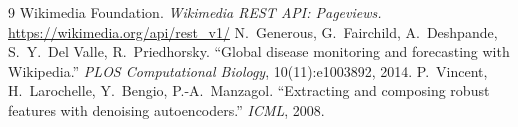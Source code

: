 \documentclass[11pt]{article}
\begin{document}
\begin{thebibliography}{9}
Wikimedia Foundation. \emph{Wikimedia REST API: Pageviews.}\\
\url{https://wikimedia.org/api/rest_v1/}
N.~Generous, G.~Fairchild, A.~Deshpande, S.~Y.~Del Valle, R.~Priedhorsky.
``Global disease monitoring and forecasting with Wikipedia.''
\emph{PLOS Computational Biology}, 10(11):e1003892, 2014.
P.~Vincent, H.~Larochelle, Y.~Bengio, P.-A.~Manzagol.
``Extracting and composing robust features with denoising autoencoders.''
\emph{ICML}, 2008.
\end{thebibliography}
\end{document}
